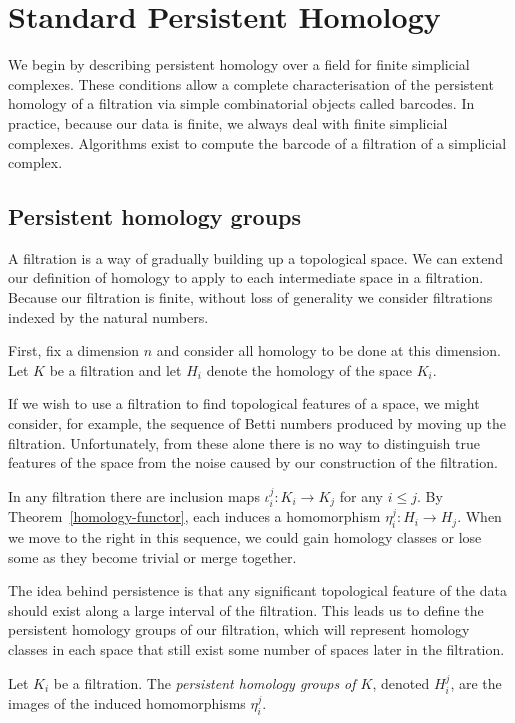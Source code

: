 \section{Standard Persistent Homology}
\label{section-standard}

We begin by describing persistent homology over a field for finite simplicial complexes. These conditions allow a complete characterisation of the persistent homology of a filtration via simple combinatorial objects called barcodes. In practice, because our data is finite, we always deal with finite simplicial complexes. Algorithms exist to compute the barcode of a filtration of a simplicial complex.

\subsection{Persistent homology groups}

A filtration is a way of gradually building up a topological space. We can extend our definition of homology to apply to each intermediate space in a filtration. Because our filtration is finite, without loss of generality we consider filtrations indexed by the natural numbers.

First, fix a dimension $n$ and consider all homology to be done at this dimension. Let $K$ be a filtration and let $H_i$ denote the homology of the space $K_i$.

If we wish to use a filtration to find topological features of a space, we might consider, for example, the sequence of Betti numbers produced by moving up the filtration. Unfortunately, from these alone there is no way to distinguish true features of the space from the noise caused by our construction of the filtration.

In any filtration there are inclusion maps $\iota_i^j : K_i \to K_j$ for any $i \leq j$. By Theorem~\ref{homology-functor}, each induces a homomorphism $\eta_i^j : H_i \to H_j$. When we move to the right in this sequence, we could gain homology classes or lose some as they become trivial or merge together.

The idea behind persistence is that any significant topological feature of the data should exist along a large interval of the filtration. This leads us to define the persistent homology groups of our filtration, which will represent homology classes in each space that still exist some number of spaces later in the filtration.

\begin{definition}
Let $K_i$ be a filtration. The \emph{persistent homology groups of $K$}, denoted $H_i^j$, are the images of the induced homomorphisms $\eta_i^j$.
\end{definition}

